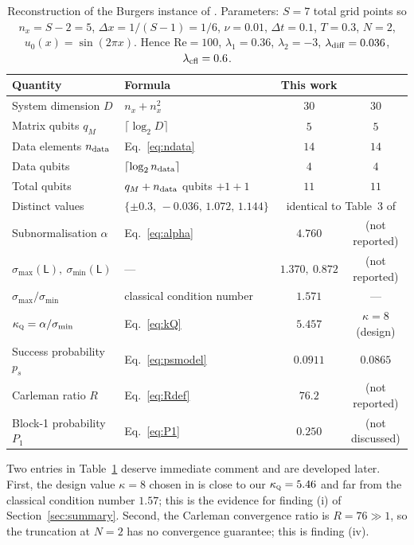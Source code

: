 \documentclass[11pt,a4paper]{article}
\theoremstyle{plain}
\theoremstyle{definition}
\theoremstyle{remark}
\newcommand{\Rey}{\mathrm{Re}}
\newcommand{\Lmat}{\mathsf{L}}
\newcommand{\kQ}{\kappa_{\textsc{q}}}
\begin{document}
\begin{table}[htbp]
\centering
\caption{Reconstruction of the Burgers instance of \cite[§4.3, Tables~3--4]{Setty2026}.
Parameters: $S=7$ total grid points so $n_x=S-2=5$, $\Delta x=1/(S-1)=1/6$,
$\nu=0.01$, $\Delta t=0.1$, $T=0.3$, $N=2$, $u_0(x)=\sin(2\pi x)$.  Hence
$\Rey=100$, $\lambda_1=0.36$, $\lambda_2=-3$, $\lambda_{\rm diff}=0.036$,
$\lambda_{\rm cfl}=0.6$.}
\label{tab:reference}
\small
\begin{tabular}{@{}llcc@{}}
\toprule
Quantity & Formula & This work & \cite{Setty2026}\\
\midrule
System dimension $D$ & $n_x+n_x^2$ & $30$ & $30$\\
Matrix qubits $q_M$ & $\lceil\log_2 D\rceil$ & $5$ & $5$\\
Data elements $n_{\rm data}$ & Eq.~\eqref{eq:ndata} & $14$ & $14$\\
Data qubits & $\lceil\log_2 n_{\rm data}\rceil$ & $4$ & $4$\\
Total qubits & $q_M+n_{\rm data}$ qubits $+1+1$ & $11$ & $11$\\
Distinct values & $\{\pm0.3,\,-0.036,\,1.072,\,1.144\}$ & \multicolumn{2}{c}{identical to Table~3 of \cite{Setty2026}}\\
Subnormalisation $\alpha$ & Eq.~\eqref{eq:alpha} & $4.760$ & (not reported)\\
$\sigma_{\max}(\Lmat),\ \sigma_{\min}(\Lmat)$ & --- & $1.370,\ 0.872$ & (not reported)\\
$\sigma_{\max}/\sigma_{\min}$ & classical condition number & $1.571$ & ---\\
$\kQ=\alpha/\sigma_{\min}$ & Eq.~\eqref{eq:kQ} & $\mathbf{5.457}$ & $\kappa=8$ (design)\\
Success probability $p_s$ & Eq.~\eqref{eq:psmodel} & $\mathbf{0.0911}$ & $\mathbf{0.0865}$\\
Carleman ratio $R$ & Eq.~\eqref{eq:Rdef} & $\mathbf{76.2}$ & (not reported)\\
Block-1 probability $P_1$ & Eq.~\eqref{eq:P1} & $0.250$ & (not discussed)\\
\bottomrule
\end{tabular}
\end{table}

Two entries in Table~\ref{tab:reference} deserve immediate comment and are
developed later.  First, the design value $\kappa=8$ chosen in \cite{Setty2026}
is close to our $\kQ=5.46$ and far from the classical condition number $1.57$;
this is the evidence for finding (i) of Section~\ref{sec:summary}.  Second, the
Carleman convergence ratio is $R=76\gg1$, so the truncation at $N=2$ has no
convergence guarantee; this is finding (iv).
\end{document}
